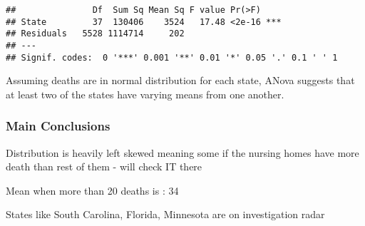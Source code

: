 \documentclass[
]{article}
\begin{document}
\begin{verbatim}
##               Df  Sum Sq Mean Sq F value Pr(>F)    
## State         37  130406    3524   17.48 <2e-16 ***
## Residuals   5528 1114714     202                   
## ---
## Signif. codes:  0 '***' 0.001 '**' 0.01 '*' 0.05 '.' 0.1 ' ' 1
\end{verbatim}

Assuming deaths are in normal distribution for each state, ANova
suggests that at least two of the states have varying means from one
another.

\hypertarget{main-conclusions}{%
\subsubsection{Main Conclusions}\label{main-conclusions}}

Distribution is heavily left skewed meaning some if the nursing homes
have more death than rest of them - will check IT there

Mean when more than 20 deaths is : 34

States like South Carolina, Florida, Minnesota are on investigation
radar
\end{document}
